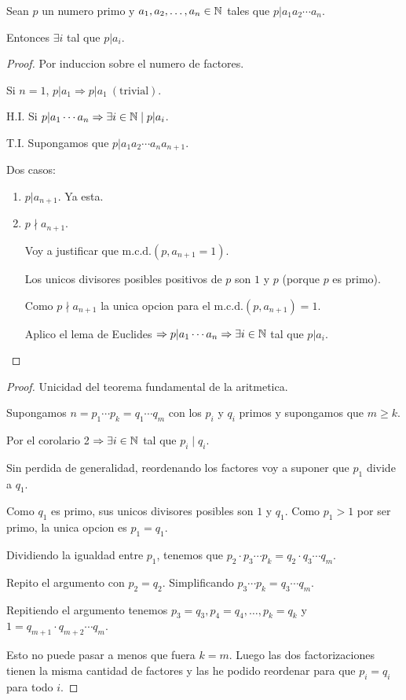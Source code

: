 \begin{corollary}
	Sean \(p \) un numero primo y \(a_1,a_2,\ldots,a_n \in \mathbb{N} \) tales que \(p|a_{1}a_2 \cdots a_n \).
	
	Entonces \(\exists i \) tal que \(p | a_i \).
\end{corollary}
\begin{proof}
	Por induccion sobre el numero de factores.
	
	Si \(n = 1 \), \(p|a_1 \Rightarrow p|{a_1}\ (\text{trivial}).\)
	
	H.I. Si \(p|a_1\cdots a_n \Rightarrow \exists i \in \mathbb{N} \mid p|a_i \).
	
	T.I. Supongamos que \(p|a_1 a_2 \cdots a_n a_{n+1}\).
	
	Dos casos:
	\begin{enumerate}
		\item \(p | a_{n+1 }\). Ya esta.
		\item \(p \nmid a_{n+1 }\).
		      
		      Voy a justificar que \(\mathrm{m.c.d.}(p, a_{n+1} = 1)\).
		      
		      Los unicos divisores posibles positivos de \(p \) son \(1 \) y \(p \) (porque \(p \) es primo).
		      
		      Como \(p \nmid a_{n+1}\) la unica opcion para el \(\mathrm{m.c.d.}(p,a_{n+1}) = 1 \).
		      
		      Aplico el lema de Euclides \(\Rightarrow p | a_1 \cdots a_n \Rightarrow \exists i \in \mathbb{N} \) tal que \(p | a_i \).
	\end{enumerate}
\end{proof}

\begin{proof}
	Unicidad del teorema fundamental de la aritmetica.
	
	Supongamos \(n = p_1 \cdots p_k = q_1 \cdots q_m \) con los \(p_i \) y \(q_i \) primos y supongamos que \(m \geq k \).
	
	Por el corolario 2 \(\Rightarrow \exists i \in \mathbb{N} \) tal que \(p_i \mid q_i\).
	
	Sin perdida de generalidad, reordenando los factores voy a suponer que \(p_1 \) divide a \(q_1 \).
	
	Como \(q_1 \) es primo, sus unicos divisores posibles son \(1 \) y \(q_1 \). Como \(p_1 > 1 \) por ser primo, la unica opcion es \(p_1 = q_1 \).
	
	Dividiendo la igualdad entre \(p_1 \), tenemos que \(p_2 \cdot p_3 \cdots p_k = q_2 \cdot q_3 \cdots q_m \).
	
	Repito el argumento con \(p_2 = q_2 \). Simplificando \(p_3 \cdots p_k = q_3 \cdots q_m \).
	
	Repitiendo el argumento tenemos \(p_3 = q_3, p_4 = q_4, \ldots, p_k = q_k \) y \(1 = q_{m+1} \cdot q_{m+2} \cdots q_m\).
	
	Esto no puede pasar a menos que fuera \(k = m \). Luego las dos factorizaciones tienen la misma cantidad de factores y las he podido reordenar para que \(p_i = q_i \) para todo \(i \).
	
\end{proof}

